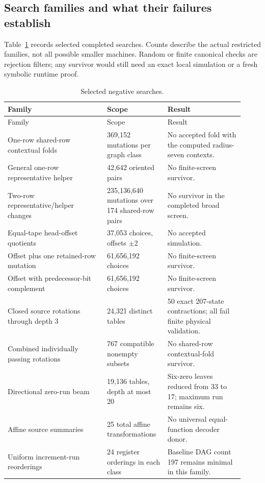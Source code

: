 \documentclass[11pt,a4paper]{article}
\begin{document}
\subsection{Search families and what their failures establish}

Table~\ref{tab:negative} records selected completed searches. Counts describe
the actual restricted families, not all possible smaller machines. Random
or finite canonical checks are rejection filters; any survivor would still
need an exact local simulation or a fresh symbolic runtime proof.

\begin{longtable}{@{}p{0.39\linewidth}p{0.23\linewidth}p{0.30\linewidth}@{}}
\caption{Selected negative searches.}\label{tab:negative}\\
\toprule Family & Scope & Result\\\midrule\endfirsthead
\toprule Family & Scope & Result\\\midrule\endhead
One-row shared-row contextual folds & 369,152 mutations per graph class & No accepted fold with the computed radius-seven contexts.\\
General one-row representative helper & 42,642 oriented pairs & No finite-screen survivor.\\
Two-row representative/helper changes & 235,136,640 mutations over 174 shared-row pairs & No survivor in the completed broad screen.\\
Equal-tape head-offset quotients & 37,053 choices, offsets $\pm2$ & No accepted simulation.\\
Offset plus one retained-row mutation & 61,656,192 choices & No finite-screen survivor.\\
Offset with predecessor-bit complement & 61,656,192 choices & No finite-screen survivor.\\
Closed source rotations through depth 3 & 24,321 distinct tables & 50 exact 207-state contractions; all fail finite physical validation.\\
Combined individually passing rotations & 767 compatible nonempty subsets & No shared-row contextual-fold survivor.\\
Directional zero-run beam & 19,136 tables, depth at most 20 & Six-zero leaves reduced from 33 to 17; maximum run remains six.\\
Affine source summaries & 25 total affine transformations & No universal equal-function decoder donor.\\
Uniform increment-run reorderings & 24 register orderings in each class & Baseline DAG count 197 remains minimal in this family.\\
\bottomrule
\end{longtable}
\end{document}
